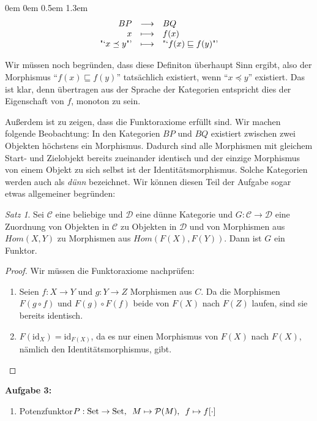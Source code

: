 \documentclass[a4paper,ngerman]{scrartcl}
\theoremstyle{definition}
\theoremstyle{plain}
\theoremstyle{remark}
\newtheorem*{satz}{Satz}
\newcommand{\C}{\mathcal{C}}
\newcommand{\Set}{\mathrm{Set}}
\newcommand{\id}{\mathrm{id}}
\newcommand{\D}{\mathcal{D}}
\begin{document}
\begin{list}{}{0em \leftmargin0em \itemindent0.5em \itemsep 1.3em}
\[ \begin{array}{@{}rcl@{}}
  BP &\longrightarrow& BQ\\
  x  &\longmapsto& f(x)\\
  \text{"`$x \preceq y$"'} &\longmapsto& \text{"`$f(x) \sqsubseteq f(y)$"'}
\end{array} \]

Wir müssen noch begründen, dass diese Definiton überhaupt Sinn ergibt, also der Morphismus "`$f(x) \sqsubseteq f(y)$"' tatsächlich existiert, wenn "`$x \preceq y$"' existiert. Das ist klar, denn übertragen aus der Sprache der Kategorien entspricht dies der Eigenschaft von $f$, monoton zu sein.

Außerdem ist zu zeigen, dass die Funktoraxiome erfüllt sind. Wir machen folgende Beobachtung: In den Kategorien $BP$ und $BQ$ existiert zwischen zwei Objekten höchstens ein Morphismus. Dadurch sind alle Morphismen mit gleichem Start- und Zielobjekt bereits zueinander identisch und der einzige Morphismus von einem Objekt zu sich selbst ist der Identitätsmorphismus. Solche Kategorien werden auch als \emph{dünn} bezeichnet. Wir können diesen Teil der Aufgabe sogar etwas allgemeiner begründen:\\


\begin{satz}
  Sei $\C$ eine beliebige und $\D$ eine dünne Kategorie und $G : \C \to \D$ eine Zuordnung von Objekten in $\C$ zu Objekten in $\D$ und von Morphismen aus $Hom(X, Y)$ zu Morphismen aus $Hom(F(X), F(Y))$. Dann ist $G$ ein Funktor.
\end{satz}

\begin{proof}
Wir müssen die Funktoraxiome nachprüfen:
\begin{enumerate}
\item Seien $f : X \to Y$ und $g : Y \to Z$ Morphismen aus $C$. Da die Morphismen $F(g \circ f)$ und $F(g) \circ F(f)$ beide von $F(X)$ nach $F(Z)$ laufen, sind sie bereits identisch.
\item $F(\id_X) = \id_{F(X)}$, da es nur einen Morphismus von $F(X)$ nach $F(X)$, nämlich den Identitätsmorphismus, gibt.\qedhere
\end{enumerate}
\end{proof}

\item[\textbf{Aufgabe 3:}]\mbox{}

\begin{enumerate}
\item Potenzfunktor\enskip$P : \Set \to \Set, \enskip M \mapsto \mathcal{P}(M), \enskip f \mapsto f[\cdot]$


\end{enumerate}
\end{list}
\end{document}
